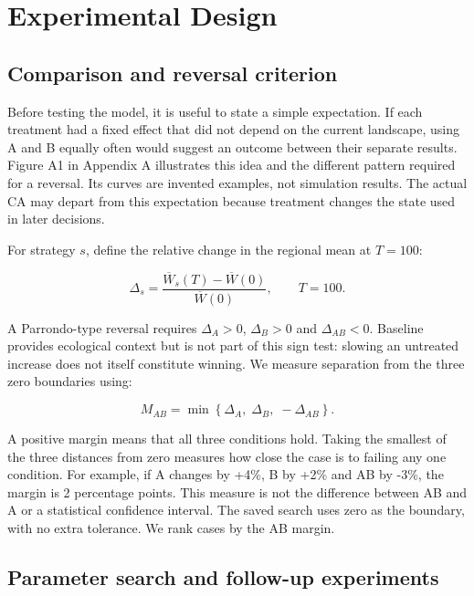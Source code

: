 \documentclass[a4paper,11pt]{article}
\begin{document}
\section{Experimental Design}

\subsection{Comparison and reversal criterion}

Before testing the model, it is useful to state a simple expectation. If each treatment had a fixed effect that did not depend on the current landscape, using A and B equally often would suggest an outcome between their separate results. Figure A1 in Appendix A illustrates this idea and the different pattern required for a reversal. Its curves are invented examples, not simulation results. The actual CA may depart from this expectation because treatment changes the state used in later decisions.

For strategy $s$, define the relative change in the regional mean at $T=100$:

\begin{equation}
\Delta_s=\frac{\overline{W}_s(T)-\overline{W}(0)}{\overline{W}(0)},
\qquad T=100.
\label{eq:change}
\end{equation}

A Parrondo-type reversal requires $\Delta_A>0$, $\Delta_B>0$ and $\Delta_{AB}<0$. Baseline provides ecological context but is not part of this sign test: slowing an untreated increase does not itself constitute winning. We measure separation from the three zero boundaries using:

\begin{equation}
M_{AB}=\min\!\left\{\Delta_A,\;\Delta_B,\;-\Delta_{AB}\right\}.
\label{eq:margin}
\end{equation}

A positive margin means that all three conditions hold. Taking the smallest of the three distances from zero measures how close the case is to failing any one condition. For example, if A changes by +4\%, B by +2\% and AB by -3\%, the margin is 2 percentage points. This measure is not the difference between AB and A or a statistical confidence interval. The saved search uses zero as the boundary, with no extra tolerance. We rank cases by the AB margin.

\subsection{Parameter search and follow-up experiments}
\end{document}
